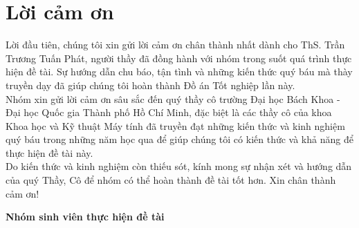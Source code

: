 \section*{Lời cảm ơn}
\thispagestyle{empty}

\indent \indent Lời đầu tiên, chúng tôi xin gửi lời cảm ơn chân thành nhất dành cho ThS. Trần Trương Tuấn Phát, người thầy đã đồng hành với nhóm trong suốt quá trình thực hiện đề tài. Sự hướng dẫn chu báo, tận tình và những kiến thức quý báu mà thày truyền dạy đã giúp chúng tôi hoàn thành Đồ án Tốt nghiệp lần này.
\\
\indent Nhóm xin gửi lời cảm ơn sâu sắc đến quý thầy cô trường Đại học Bách Khoa - Đại học Quốc gia Thành phố Hồ Chí Minh, đặc biệt là các thầy cô của khoa Khoa học và Kỹ thuật Máy tính đã truyền đạt những kiến thức và kinh nghiệm quý báu trong những năm học qua để giúp chúng tôi có kiến thức và khả năng để thực hiện đề tài này.
\\
\indent Do kiến thức và kinh nghiệm còn thiếu sót, kính mong sự nhận xét và hướng dẫn của quý Thầy, Cô để nhóm có thể hoàn thành đề tài tốt hơn. Xin chân thành cảm ơn!

\begin{flushright}
\textbf{Nhóm sinh viên thực hiện đề tài}
\end{flushright}

\clearpage
{}
